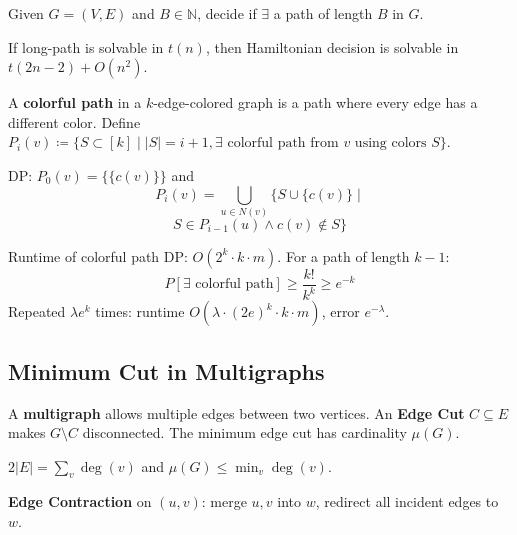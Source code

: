 \begin{definition}
	Given $G = (V,E)$ and $B \in \mathbb{N}$, decide if $\exists$ a path of length $B$ in $G$.
\end{definition}

\begin{theorem}
	If long-path is solvable in $t(n)$, then Hamiltonian decision is solvable in $t(2n-2) + O(n^2)$.
\end{theorem}

\begin{definition}
	A \textbf{colorful path} in a $k$-edge-colored graph is a path where every edge has a different color. Define $P_i(v) \coloneqq \{S \subset [k] \mid |S|=i+1, \exists \text{ colorful path from } v \text{ using colors } S\}$.
\end{definition}

\begin{lemma}
	DP: $P_0(v) = \{\{c(v)\}\}$ and
	$$P_i(v) = \bigcup_{u \in N(v)} \{S \cup \{c(v)\} \mid$$
	$$S \in P_{i-1}(u) \land c(v) \notin S\}$$
\end{lemma}

\begin{theorem}
	Runtime of colorful path DP: $O(2^k \cdot k \cdot m)$. For a path of length $k-1$:
	$$P[\exists \text{ colorful path}] \geq \frac{k!}{k^k} \geq e^{-k}$$
	Repeated $\lambda e^k$ times: runtime $O(\lambda \cdot (2e)^k \cdot k \cdot m)$, error $e^{-\lambda}$.
\end{theorem}

\subsection{Minimum Cut in Multigraphs}

\begin{definition}
	A \textbf{multigraph} allows multiple edges between two vertices. An \textbf{Edge Cut} $C \subseteq E$ makes $G \setminus C$ disconnected. The minimum edge cut has cardinality $\mu(G)$.
\end{definition}

\begin{lemma}
	$2|E| = \sum_{v} \deg(v)$ and $\mu(G) \leq \min_v \deg(v)$.
\end{lemma}

\begin{definition}
	\textbf{Edge Contraction} on $(u,v)$: merge $u,v$ into $w$, redirect all incident edges to $w$.
\end{definition}

